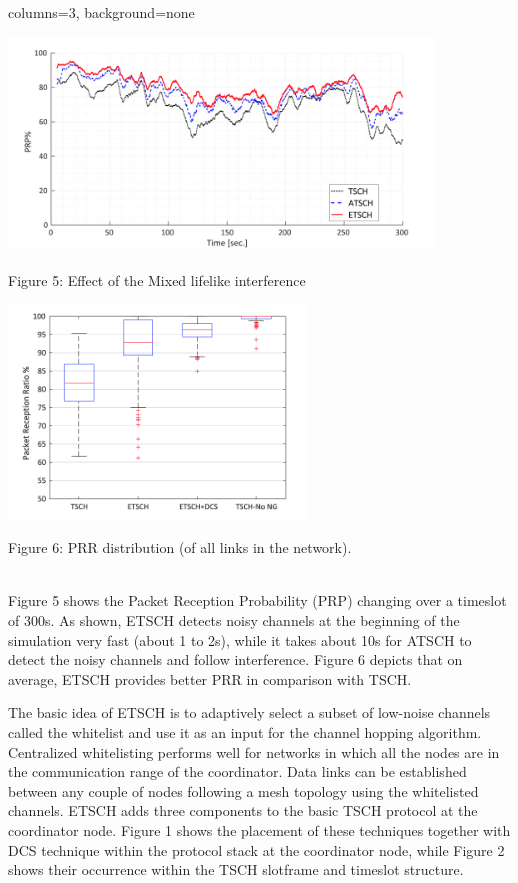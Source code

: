 \documentclass[portrait,paperwidth=91cm,paperheight=121cm,fontscale=0.35]{baposter} %
\begin{document}
\begin{poster}{columns=3, background=none}
{      \centering
      \includegraphics[height=5.7cm, width=\textwidth]{redblue.png}
      \caption{Figure 5: Effect of the Mixed lifelike interference }
      
      \centering
      \includegraphics[height=5.7cm, width=\textwidth]{prrdist.png}
      \caption{Figure 6: PRR distribution (of all links in the network).}\\
      \vspace{5mm}
Figure 5 shows the Packet Reception Probability (PRP) changing over a timeslot of 300s. As shown, ETSCH detects noisy channels at the beginning of the simulation very fast (about 1 to 2s), while it takes about 10s for ATSCH to detect the noisy channels and follow interference. Figure 6 depicts that on average, ETSCH provides better PRR in comparison with TSCH. 
}

{The basic idea of ETSCH is to adaptively select a subset of low-noise channels called the whitelist
and use it as an input for the channel hopping algorithm. Centralized whitelisting performs well
for networks in which all the nodes are in the communication range of the coordinator. Data links
can be established between any couple of nodes following a mesh topology using the whitelisted
channels. ETSCH adds three components to the basic TSCH protocol at the coordinator node.
Figure 1 shows the placement of these techniques together with DCS technique within the protocol
stack at the coordinator node, while Figure 2 shows their occurrence within the TSCH slotframe
and timeslot structure.

}
\end{poster}
\end{document}
